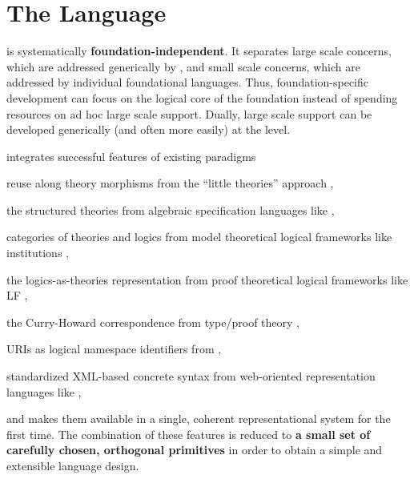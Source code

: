 \section{The \mmt Language}

\mmt is systematically \textbf{foundation-independent}.
It separates large scale concerns, which are addressed generically by {\mmt}, and small scale concerns, which are addressed by individual foundational languages.
Thus, foundation-specific development can focus on the logical core of the foundation instead of spending resources on ad hoc large scale support.
Dually, large scale support can be developed generically (and often more easily) at the {\mmt} level.

\mmt integrates successful features of existing paradigms
\begin{compactitem}
\item reuse along theory morphisms from the ``little theories'' approach \cite{littletheories},
\item the structured theories from algebraic specification languages like \cite{asl},
\item categories of theories and logics from model theoretical logical frameworks like institutions \cite{institutions},
\item the logics-as-theories representation from proof theoretical logical frameworks like LF \cite{lf},
\item the Curry-Howard correspondence from type/proof theory \cite{curry,howard},
\item URIs as logical namespace identifiers from {\openmath} \cite{openmath},
\item standardized XML-based concrete syntax from web-oriented representation languages like {\omdoc} \cite{omdoc},
\end{compactitem}
and makes them available in a single, coherent representational system for the first time.
The combination of these features is reduced to \textbf{a small set of carefully chosen, orthogonal primitives} in order to obtain a simple and extensible language design.

